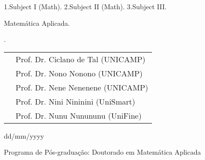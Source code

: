 \begin{titlepage}
  1.Subject I (Math). 2.Subject II (Math).
3.Subject III.


 Matem\'atica Aplicada.


. %


\noindent 
\begin{tabular}{ll}
\hspace{-0.1cm}{Banca Examinadora:} & Prof. Dr. Ciclano de Tal (UNICAMP)\\
& Prof. Dr. Nono Nonono  (UNICAMP)\\
& Prof. Dr. Nene Nenenene (UNICAMP)\\
& Prof. Dr. Nini Nininini (UniSmart)\\
& Prof. Dr. Nunu Nunununu (UniFine)\\
\end{tabular}

 dd/mm/yyyy

\noindent Programa de P\'os-gradua\c{c}\~ao: Doutorado em Matem\'atica Aplicada

\onehalfspacing

\end{titlepage}

\begin{titlepage}
\thispagestyle{plain} 
\begin{figure}
\centering
 \end{figure}


\end{titlepage}

